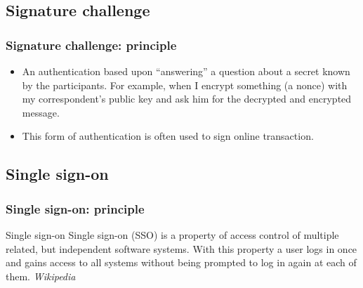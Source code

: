 
\subsection{Signature challenge}

\begin{frame}
\frametitle{Signature challenge: principle}

\begin{itemize}
\item An authentication based upon ``answering'' a question about a secret
known by the participants. For example, when I encrypt something (a nonce)
with my correspondent's public key and ask him for the decrypted and encrypted
message.

\item This form of authentication is often used to sign online
  transaction.
\end{itemize}

\end{frame}

\subsection{Single sign-on}

\begin{frame}
\frametitle{Single sign-on: principle}

\begin{block}{Single sign-on}
Single sign-on (SSO) is a property of access control of multiple
related, but independent software systems. With this property a user
logs in once and gains access to all systems without being prompted to
log in again at each of them. \textit{Wikipedia}
\end{block}

\end{frame}


